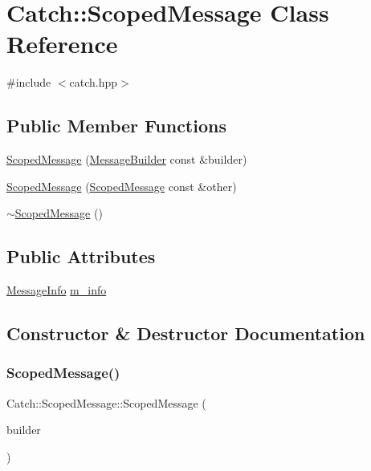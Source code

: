 \hypertarget{class_catch_1_1_scoped_message}{}\section{Catch\+:\+:Scoped\+Message Class Reference}
\label{class_catch_1_1_scoped_message}


{\ttfamily \#include $<$catch.\+hpp$>$}

\subsection*{Public Member Functions}
\begin{DoxyCompactItemize}
\item 
\mbox{\hyperlink{class_catch_1_1_scoped_message_a5cc59f0f2ebe840e6607f83004d49a17}{Scoped\+Message}} (\mbox{\hyperlink{struct_catch_1_1_message_builder}{Message\+Builder}} const \&builder)
\item 
\mbox{\hyperlink{class_catch_1_1_scoped_message_ae03a17fd47220d563d4abc73e7518e29}{Scoped\+Message}} (\mbox{\hyperlink{class_catch_1_1_scoped_message}{Scoped\+Message}} const \&other)
\item 
\mbox{\hyperlink{class_catch_1_1_scoped_message_a43190843f9eeb84a0b42b0bc95fdf93a}{$\sim$\+Scoped\+Message}} ()
\end{DoxyCompactItemize}
\subsection*{Public Attributes}
\begin{DoxyCompactItemize}
\item 
\mbox{\hyperlink{struct_catch_1_1_message_info}{Message\+Info}} \mbox{\hyperlink{class_catch_1_1_scoped_message_ae6e1476f389cc6e1586f033b3747b27b}{m\+\_\+info}}
\end{DoxyCompactItemize}


\subsection{Constructor \& Destructor Documentation}
\mbox{\label{class_catch_1_1_scoped_message_a5cc59f0f2ebe840e6607f83004d49a17}} 
\subsubsection{\texorpdfstring{Scoped\+Message()}{ScopedMessage()}\hspace{0.1cm}{\footnotesize\ttfamily [1/2]}}
{\footnotesize\ttfamily Catch\+::\+Scoped\+Message\+::\+Scoped\+Message (\begin{DoxyParamCaption}\item[{\mbox{\hyperlink{struct_catch_1_1_message_builder}{Message\+Builder}} const \&}]{builder }\end{DoxyParamCaption})}

